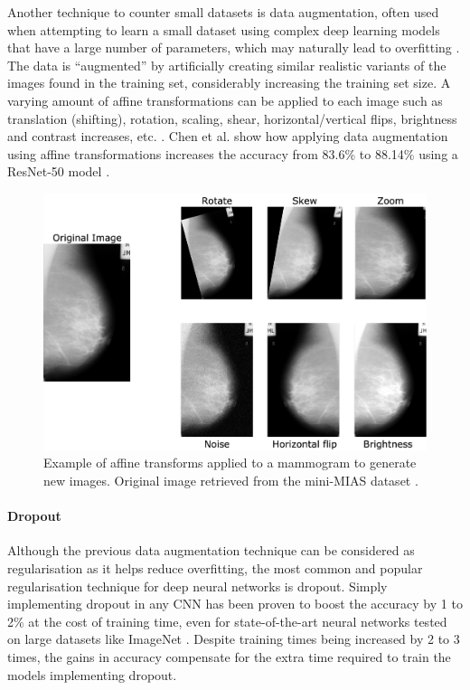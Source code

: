 Another technique to counter small datasets is data augmentation, often used when attempting to learn a small dataset using complex deep learning models that have a large number of parameters, which may naturally lead to overfitting \citep{Jadoon2017}. The data is ``augmented'' by artificially creating similar realistic variants of the images found in the training set, considerably increasing the training set size. A varying amount of affine transformations can be applied to each image such as translation (shifting), rotation, scaling, shear, horizontal/vertical flips, brightness and contrast increases, etc. \citep{Geron2019}. Chen et al. show how applying data augmentation using affine transformations increases the accuracy from 83.6\% to 88.14\% using a ResNet-50 model \citep{Chen2019}.

\begin{figure}[ht]
\centerline{\includegraphics[width=\textwidth]{figures/litsurvey/Data augmentation examples.png}}
\caption{\label{fig:litsurvey-Data augmentation example}Example of affine transforms applied to a mammogram to generate new images. Original image retrieved from the mini-MIAS dataset \citep{Suckling1994}.}
\end{figure}

\paragraph{Dropout}

Although the previous data augmentation technique can be considered as regularisation as it  helps reduce overfitting, the most common and popular regularisation technique for deep neural networks is dropout. Simply implementing dropout in any CNN has been proven to boost the accuracy by 1 to 2\% \citep{Geron2019} at the cost of training time, even for state-of-the-art neural networks tested on large datasets like ImageNet \citep{Srivastava2014}. Despite training times being increased by 2 to 3 times, the gains in accuracy compensate for the extra time required to train the models implementing dropout.\\

